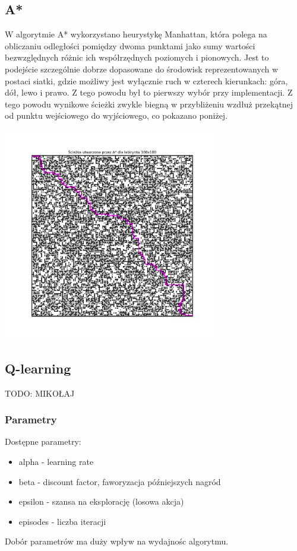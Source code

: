 \documentclass[a4paper,12pt]{article}
\begin{document}
\subsection{A*}
	W algorytmie A* wykorzystano heurystykę Manhattan, która polega na obliczaniu odległości pomiędzy dwoma punktami jako sumy wartości bezwzględnych różnic ich współrzędnych poziomych i pionowych. Jest to podejście szczególnie dobrze dopasowane do środowisk reprezentowanych w postaci siatki, gdzie możliwy jest wyłącznie ruch w czterech kierunkach: góra, dół, lewo i prawo. Z tego powodu był to pierwszy wybór przy implementacji. Z tego powodu wynikowe ścieżki zwykle biegną w przybliżeniu wzdłuż przekątnej od punktu wejściowego do wyjściowego, co pokazano poniżej.
\begin{center}
    \includegraphics[width=0.7\textwidth]{../images/A*_path.png}
\end{center}

\subsection{Q-learning}
	TODO: MIKOŁAJ %
    \subsubsection{Parametry}
    Dostępne parametry:
    \begin{itemize}
        \item alpha - learning rate
        \item beta - discount factor, faworyzacja późniejszych nagród
        \item epsilon - szansa na eksplorację (losowa akcja)
        \item episodes - liczba iteracji
    \end{itemize}
    Dobór parametrów ma duży wpływ na wydajnośc algorytmu.
\end{document}
